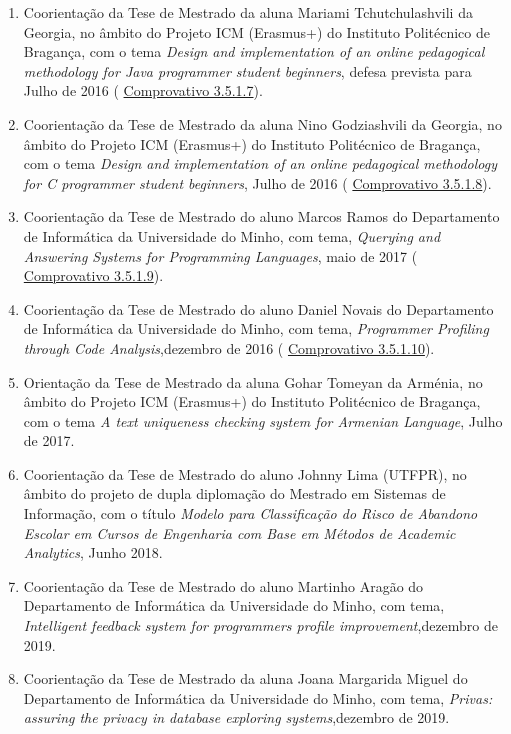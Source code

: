 \documentclass[11pt]{article}
\begin{document}
\begin{enumerate}
\item{Coorientação da Tese de Mestrado da aluna Mariami Tchutchulashvili da Georgia, no âmbito do Projeto ICM (Erasmus+) do Instituto Politécnico de Bragança, com o tema {
\em{ Design and implementation of an online pedagogical methodology for Java programmer student beginners}}, defesa prevista para Julho de 2016 (
\href{run:CoOrientTrabalhos/emdesenvolvimento/Mariami.pdf}{Comprovativo 3.5.1.7}).}
\item{Coorientação da Tese de Mestrado da aluna Nino Godziashvili da Georgia, no âmbito do Projeto ICM (Erasmus+) do Instituto Politécnico de Bragança, com o tema {
\em{ Design and implementation of an online pedagogical methodology for C programmer student beginners}}, Julho de 2016 (
\href{run:CoOrientTrabalhos/emdesenvolvimento/Nino.pdf}{Comprovativo 3.5.1.8}).}
\item{Coorientação da Tese de Mestrado do aluno Marcos Ramos do Departamento de Informática da Universidade do Minho, com tema, {
\em{ Querying and Answering Systems for Programming Languages}}, maio de 2017 (
\href{run:CoOrientTrabalhos/emdesenvolvimento/MarcosRamos.pdf}{Comprovativo 3.5.1.9}).}
\item{Coorientação da Tese de Mestrado do aluno Daniel Novais do Departamento de Informática da Universidade do Minho, com tema, {
\em{ Programmer Profiling through Code Analysis}},dezembro de 2016 (
\href{run:CoOrientTrabalhos/emdesenvolvimento/DanielNovais.pdf}{Comprovativo 3.5.1.10}).}
\item{Orientação da Tese de Mestrado da aluna Gohar Tomeyan da Arménia, no âmbito do Projeto ICM (Erasmus+) do Instituto Politécnico de Bragança, com o tema {
\em{ A text uniqueness checking system for Armenian Language}}, Julho de 2017. }
\item{Coorientação da Tese de Mestrado do aluno Johnny Lima (UTFPR), no âmbito do projeto de dupla diplomação do Mestrado em Sistemas de Informação, com o título {
\em{ Modelo para Classificação do Risco de Abandono Escolar em Cursos de Engenharia com Base em Métodos de Academic Analytics}}, Junho 2018.}
\item{Coorientação da Tese de Mestrado do aluno Martinho Aragão do Departamento de Informática da Universidade do Minho, com tema, {
\em{ Intelligent feedback system for programmers profile improvement}},dezembro de 2019.}
\item{Coorientação da Tese de Mestrado da aluna Joana Margarida Miguel do Departamento de Informática da Universidade do Minho, com tema, {
\em{ Privas: assuring the privacy in database exploring systems}},dezembro de 2019.}

\end{enumerate}
\end{document}
